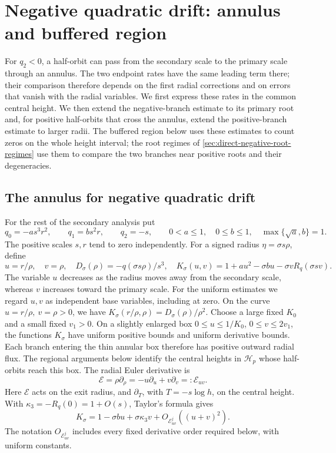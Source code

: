 \section{Negative quadratic drift: annulus and buffered region}
\label{sec:direct-negative-annulus-buffer}

For \(q_2<0\), a half-orbit can pass from the secondary scale to the
primary scale through an annulus. The two endpoint rates have the same
leading term there; their comparison therefore depends on the first
radial corrections and on errors that vanish with the radial variables.
We first express these rates in the common central height. We then extend
the negative-branch estimate to its primary root and, for positive
half-orbits that cross the annulus, extend the positive-branch estimate
to larger radii. The buffered region below uses these estimates to count
zeros on the whole height interval; the root regimes of
\cref{sec:direct-negative-root-regimes} use them to compare the two
branches near positive roots and their degeneracies.

\subsection{The annulus for negative quadratic drift}
\label{sec:direct-negative-annulus}

For the rest of the secondary analysis put
\begin{equation}
\label{eq:direct-negative-secondary-scales}
 q_0=-as^3r^2,\qquad q_1=bs^2r,\qquad q_2=-s,\qquad
 0<a\le1,\quad 0\le b\le1,\quad \max\{\sqrt a,b\}=1.
\end{equation}
The positive scales \(s,r\) tend to zero independently.
For a signed radius \(\eta=\sigma s\rho\), define
\[
 u=r/\rho,\quad v=\rho,\quad
 D_\sigma(\rho)=-q(\sigma s\rho)/s^3,\quad
 K_\sigma(u,v)=1+au^2-\sigma bu-\sigma vR_q(\sigma sv).
\]
The variable \(u\) decreases as the radius moves away from the secondary
scale, whereas \(v\) increases toward the primary scale. For the uniform
estimates we regard \(u,v\) as independent base variables, including at zero.
On the curve \(u=r/\rho,\ v=\rho>0\), we have
\(K_\sigma(r/\rho,\rho)=D_\sigma(\rho)/\rho^2\).
Choose a large fixed \(K_0\) and a small fixed \(v_1>0\).
On a slightly enlarged box \(0\le u\le1/K_0\),
\(0\le v\le2v_1\), the functions \(K_\sigma\) have uniform
positive bounds and uniform derivative bounds. Each branch
entering the thin annular box therefore has positive outward
radial flux. The regional arguments below identify the central heights
in \(\mathcal H_p\) whose half-orbits reach this box. The radial Euler
derivative is
\[
 \mathcal E=\rho\partial_\rho
       =-u\partial_u+v\partial_v=:\mathcal E_{uv}.
\]
Here \(\mathcal E\) acts on the exit radius, and \(\partial_T\), with
\(T=-s\log h\), on the central height.
With \(\kappa_3=-R_q(0)=1+O(s)\), Taylor's formula gives
\begin{equation}
\label{eq:direct-annulus-drift}
 K_\sigma=1-\sigma bu+\sigma\kappa_3 v
                       +O_{\mathcal E_{uv}^j}((u+v)^2).
\end{equation}
The notation \(O_{\mathcal E_{uv}^j}\) includes every fixed
derivative order required below, with uniform constants.

